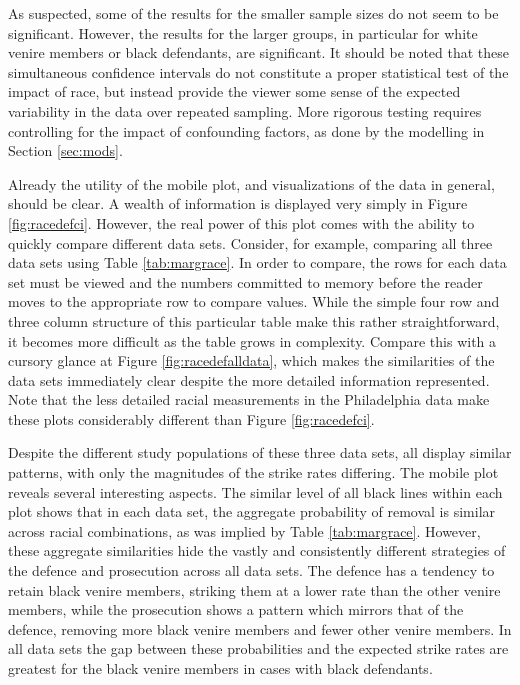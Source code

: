 \documentclass[12pt]{article}
\begin{document}
As suspected, some of the results for the smaller sample sizes do not seem to be significant. However, the results for the larger groups, in particular for white venire members or black defendants, are significant. It should be noted that these simultaneous confidence intervals do not constitute a proper statistical test of the impact of race, but instead provide the viewer some sense of the expected variability in the data over repeated sampling. More rigorous testing requires controlling for the impact of confounding factors, as done by the modelling in Section \ref{sec:mods}.


Already the utility of the mobile plot, and visualizations of the data in general, should be clear. A wealth of information is displayed very simply in Figure \ref{fig:racedefci}. However, the real power of this plot comes with the ability to quickly compare different data sets. Consider, for example, comparing all three data sets using Table \ref{tab:margrace}. In order to compare, the rows for each data set must be viewed and the numbers committed to memory before the reader moves to the appropriate row to compare values. While the simple four row and three column structure of this particular table make this rather straightforward, it becomes more difficult as the table grows in complexity. Compare this with a cursory glance at Figure \ref{fig:racedefalldata}, which makes the similarities of the data sets immediately clear despite the more detailed information represented. Note that the less detailed racial measurements in the Philadelphia data make these plots considerably different than Figure \ref{fig:racedefci}.

Despite the different study populations of these three data sets, all display similar patterns, with only the magnitudes of the strike rates differing. The mobile plot reveals several interesting aspects. The similar level of all black lines within each plot shows that in each data set, the aggregate probability of removal is similar across racial combinations, as was implied by Table \ref{tab:margrace}. However, these aggregate similarities hide the vastly and consistently different strategies of the defence and prosecution across all data sets. The defence has a tendency to retain black venire members, striking them at a lower rate than the other venire members, while the prosecution shows a pattern which mirrors that of the defence, removing more black venire members and fewer other venire members. In all data sets the gap between these probabilities and the expected strike rates are greatest for the black venire members in cases with black defendants.
\end{document}
